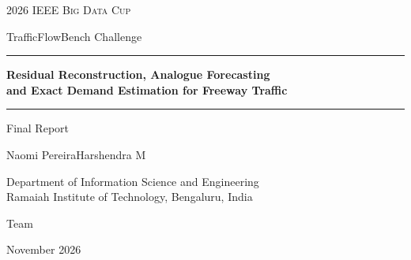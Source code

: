 \begin{titlepage}
\centering
\vspace*{16mm}
{\large\scshape 2026 IEEE Big Data Cup\par}
\vspace{1.5mm}
{TrafficFlowBench Challenge\par}
\vspace{30mm}
\rule{\linewidth}{0.8pt}\par
\vspace{6mm}
{\LARGE\bfseries Residual Reconstruction, Analogue Forecasting\\[1.5mm]
and Exact Demand Estimation for Freeway Traffic\par}
\vspace{5mm}
\rule{\linewidth}{0.4pt}\par
\vspace{7mm}
{\large Final Report\par}
\vspace{30mm}
{\large Naomi Pereira\qquad\qquad Harshendra M\par}
\vspace{6mm}
Department of Information Science and Engineering\\
Ramaiah Institute of Technology, Bengaluru, India\par
\vspace{5mm}
{\small Team \teamname\par}
\vfill
{November 2026\par}
\vspace{6mm}
\end{titlepage}

